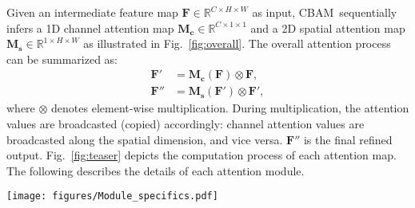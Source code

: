 \documentclass[runningheads]{llncs}
\newcommand{\figref}[1]{Fig.~\ref{#1}}
\newcommand*{\modulenameabb}{CBAM}
\begin{document}
Given an intermediate feature map \(\mathbf{F}\in \mathbb{R}^{C\times H\times W}\) as input, \modulenameabb\ sequentially infers a 1D channel attention map \(\mathbf{M_c}\in \mathbb{R}^{C\times 1\times 1}\) and a 2D spatial attention map \(\mathbf{M_s}\in \mathbb{R}^{1\times H\times W}\) as illustrated in \figref{fig:overall}.
The overall attention process can be summarized  as:
\begin{equation}\label{eq:first}
\begin{split}
    \mathbf{F'}&=\mathbf{M_c}(\mathbf{F})  \otimes \mathbf{F}, \\
    \mathbf{F''}&=\mathbf{M_s}(\mathbf{F'}) \otimes \mathbf{F'},
\end{split}
\end{equation}
where $\otimes$ denotes element-wise multiplication. During multiplication, the attention values are broadcasted (copied) accordingly: channel attention values are broadcasted along the spatial dimension, and vice versa. \(\mathbf{F''}\) is the final refined output. \figref{fig:teaser} depicts the computation process of each attention map. The following describes the details of each attention module.


\begin{figure*}[t]
  \centering
  \texttt{[image: figures/Module\_specifics.pdf]}
  \caption{\textbf{Diagram of each attention sub-module.} As illustrated, the channel sub-module utilizes both max-pooling outputs and average-pooling outputs with a shared network; the spatial sub-module utilizes similar two outputs that are pooled along the channel axis and forward them to a convolution layer.}
  \label{fig:teaser}
  \vspace{-6mm}
\end{figure*}
\end{document}
